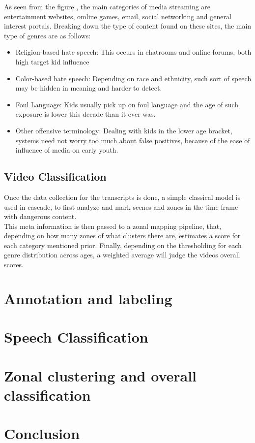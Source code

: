 \documentclass{article}
\begin{document}
As seen from the figure \href{fig:genre_dist}, the main categories of media streaming are entertainment
websites, omline games, email, social networking and general interest portals. Breaking down the type of content
found on these sites, the main type of genres are as follows: \\
\begin{itemize}
    \item{Religion-based hate speech: This occurs in chatrooms and online forums, both high target kid influence}
    \item{Color-based hate speech: Depending on race and ethnicity, such sort of speech may be hidden in meaning and
    harder to detect.}
    \item{Foul Language: Kids usually pick up on foul language and the age of such exposure is lower this decade
    than it ever was.}
    \item{Other offensive terminology: Dealing with kids in the lower age bracket, systems need not worry too much about false positives,
    because of the ease of influence of media on early youth.}
\end{itemize}


\subsection{Video Classification}

Once the data collection for the transcripts is done, a simple classical model is used in cascade, to first analyze
and mark scenes and zones in the time frame with dangerous content.\\

This meta information is then passed to a zonal mapping pipeline, that, depending on how many zones of what clusters there are,
estimates a score for each category mentioned prior. Finally, depending on the thresholding for each genre distribution across ages,
a weighted average will judge the videos overall scores.

\section{Annotation and labeling}


\section{Speech Classification}

\section{Zonal clustering and overall classification}

\section{Conclusion}



\end{document}
